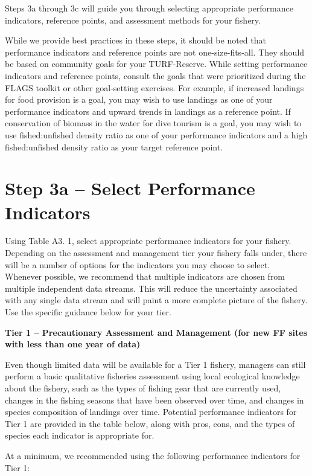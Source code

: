 \documentclass[]{book}
\begin{document}
Steps 3a through 3c will guide you through selecting appropriate
performance indicators, reference points, and assessment methods for
your fishery.

While we provide best practices in these steps, it should be noted that
performance indicators and reference points are not one-size-fits-all.
They should be based on community goals for your TURF-Reserve. While
setting performance indicators and reference points, consult the goals
that were prioritized during the FLAGS toolkit or other goal-setting
exercises. For example, if increased landings for food provision is a
goal, you may wish to use landings as one of your performance indicators
and upward trends in landings as a reference point. If conservation of
biomass in the water for dive tourism is a goal, you may wish to use
fished:unfished density ratio as one of your performance indicators and
a high fished:unfished density ratio as your target reference point.

\section{Step 3a -- Select Performance
Indicators}\label{step-3a-select-performance-indicators}

Using Table A3. 1, select appropriate performance indicators for your
fishery. Depending on the assessment and management tier your fishery
falls under, there will be a number of options for the indicators you
may choose to select. Whenever possible, we recommend that multiple
indicators are chosen from multiple independent data streams. This will
reduce the uncertainty associated with any single data stream and will
paint a more complete picture of the fishery. Use the specific guidance
below for your tier.

\textbf{Tier 1 -- Precautionary Assessment and Management (for new FF
sites with less than one year of data)}

Even though limited data will be available for a Tier 1 fishery,
managers can still perform a basic qualitative fisheries assessment
using local ecological knowledge about the fishery, such as the types of
fishing gear that are currently used, changes in the fishing seasons
that have been observed over time, and changes in species composition of
landings over time. Potential performance indicators for Tier 1 are
provided in the table below, along with pros, cons, and the types of
species each indicator is appropriate for.

At a minimum, we recommended using the following performance indicators
for Tier 1:
\end{document}
